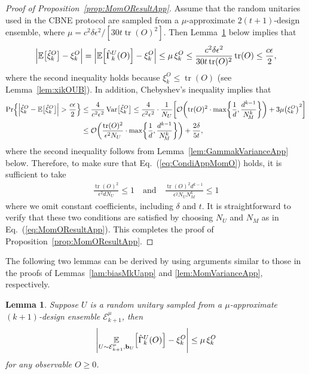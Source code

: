 \documentclass[aps,prl,twocolumn,nofootinbib,superscriptaddress,10pt]{revtex4-2}
\let\originalleft\left
\let\originalright\right
\renewcommand{\left}{\mathopen{}\mathclose\bgroup\originalleft}
\renewcommand{\right}{\aftergroup\egroup\originalright}
\def\E{ {\mathbb E} } %
\DeclareMathOperator{\Var}{Var}
\DeclareMathOperator{\Tr}{tr}
\newcommand{\bigo}[1]{\mathcal{O}\left(#1\right)}
\theoremstyle{plain}
\newtheorem{lemma}{Lemma}
\theoremstyle{definition}
\newcommand{\eref}[1]{Eq.~\textup{(\ref{#1})}}
\newcommand{\lref}[1]{Lemma~\ref{#1}}
\newcommand{\pref}[1]{Proposition~\ref{#1}}
\begin{document}
\begin{proof}[Proof of \pref{prop:MomOResultApp}]
Assume that the random unitaries used in the CBNE protocol are sampled from a 
$\mu$-approximate $2(t+1)$-design ensemble, where %
$\mu=c^2\delta\epsilon^2/[30t\Tr(O)^2]$. 
Then \lref{lam:biasGammakUapp} below implies that
\begin{align}
\left|\E\big[\hat{\xi}_k^O\big]-\xi_k^O \right| 
=\Big| \E \left[ \hat{\Gamma}_k^U (O)\right] -\xi_k^{O}\Big| 
\leq \mu\, \xi_k^{O} 
\leq \dfrac{c^2\delta\epsilon^2}{30t\Tr(O)^2} \Tr(O) 
\leq \frac{c\epsilon}{2}, 
\end{align} 
where the second inequality holds because $\xi_k^{O} \leq \Tr(O)$ (see \lref{lem:xikOUB}). 
In addition, Chebyshev's inequality implies that 
\begin{align}\label{eq:ChebyYO}
\Pr\left\{ \left|\hat{\xi}_k^O-\E\big[\hat{\xi}_k^O\big]\right| > \frac{c\epsilon}{2}\right\}
&\leq \frac{4}{c^2\epsilon^2}\Var\!\big[\hat{\xi}_k^O\big] 
\leq \frac{4}{c^2\epsilon^2} \cdot \frac{1}{N_U} 
\left[ \bigo{\Tr(O)^2 \cdot \max\left\lbrace \frac{1}{d} ,\frac{d^{k-1}}{N_{\!M}^{k}}\right\rbrace} 
+ 3\mu \left( \xi_k^{O}\right) ^2 \right] 
\nonumber\\
&\leq \bigo{\frac{\Tr(O)^2 }{\epsilon^2 N_U} \cdot \max\left\lbrace \frac{1}{d} ,\frac{d^{k-1}}{N_{\!M}^{k}} \right\rbrace } 
+ \frac{2\delta}{5 t},
\end{align} 
where the second inequality follows from \lref{lem:GammakVarianceApp} below.  
Therefore, to make sure that \eref{eq:CondiAppMomO} holds, it is sufficient to take 
\begin{align} 
	\frac{\Tr(O)^2}{\epsilon^2 dN_U} \leq 1
	\quad\text{and}\quad  
	\frac{\Tr(O)^2d^{k-1}}{\epsilon^2  N_U N_{\!M}^{k}} \leq 1 %
\end{align}
where we omit constant coefficients, including $\delta$ and $t$. 
It is straightforward to verify that these two conditions are satisfied by choosing $N_U$ and $N_M$ as in \eref{eq:MomOResultApp}. 
This completes the proof of \pref{prop:MomOResultApp}. 
\end{proof}



The following two lemmas can be derived by
using arguments similar to those in the proofs of Lemmas~\ref{lam:biasMkUapp} and \ref{lem:MomVarianceApp}, respectively.  

\begin{lemma}\label{lam:biasGammakUapp} 
Suppose $U$ is a random unitary sampled from a $\mu$-approximate $(k+1)$-design 
ensemble $\mathcal E_{k+1}^\mu$, then 
\begin{align}
\left| \underset{U\sim \mathcal E_{k+1}^\mu,\mathbf{b}_{U}}{\E} \left[ \hat{\Gamma}_k^U (O)\right] -\xi_k^{O}\right|  
\leq \mu\, \xi_k^{O} 
\end{align}
for any observable $O\geq0$. 
\end{lemma}
\end{document}
